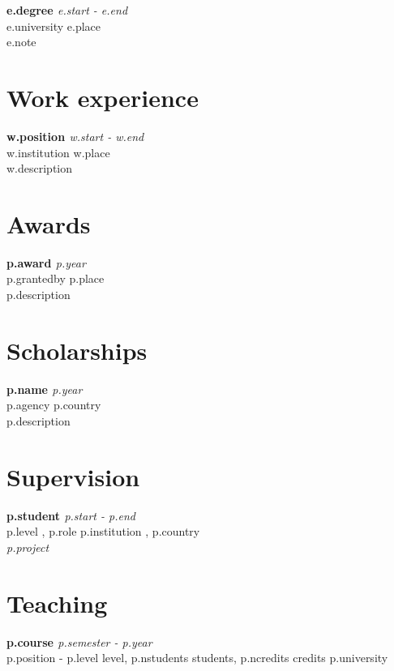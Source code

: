 \documentclass[10pt,letterpaper]{article} %
\newcommand{\cventry}[4]{ {\bf #1} \hfill {\em #2} \\ {\small \sc #3 \hfill  #4} }
\begin{document}
{%
    \cventry{ {{ e.degree }} }
    { {{ e.start }} - {{ e.end }} }
    { {{ e.university }} }
    { {{ e.place}} } \\
    {{ e.note }}
{%
\vspace{10pt}

\section*{Work experience} %

{%
    \cventry{ {{ w.position }} }
    { {{ w.start }} -   {{ w.end }} }
    { {{ w.institution }} }
    { {{ w.place }} }\\
    {{ w.description }}
{%

\section*{Awards}

{%
    \cventry{ {{ p.award }} }
    { {{ p.year }} }
    { {{ p.grantedby }} }
    { {{p.place}} }\\
    {{ p.description }}
{%

\section*{Scholarships}

{%
    \cventry{ {{ p.name }} }
    { {{ p.year }} }
    { {{ p.agency }} }
    { {{ p.country }} } \\
    {{ p.description }}
{%

\section*{Supervision}

{%
    \cventry{  {{ p.student }}  }
    { {{ p.start }} - {{p.end}} }
    { {{ p.level }}, {{ p.role }} }
    { {{ p.institution }}, {{ p.country }} } \\
    {\it {{ p.project }} }
{%


\section*{Teaching}

{%
    \cventry{ {{  p.course }}  }
    { {{ p.semester }} - {{ p.year }}  }
    { {{ p.position }}  - {{ p.level }} level, {{ p.nstudents }} students, {{ p.ncredits }} credits }
    { {{ p.university }}  } \\ {%



}}}}}}}}}}}}
\end{document}

